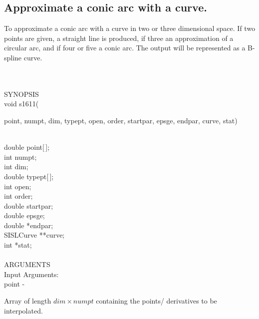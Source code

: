 \subsection{Approximate a conic arc with a curve.}
\begin{minipg1}
  To approximate a conic arc with a curve in two or three
  dimensional space. If two points are given, a straight line is
  produced, if three an approximation of a circular arc, and if four or
  five a conic arc.
  The output will be represented as a B-spline curve.
\end{minipg1} \\ \\
SYNOPSIS\\
        \>void s1611(\begin{minipg3}
                {\fov point}, {\fov numpt}, {\fov dim}, {\fov typept}, {\fov open}, {\fov order},
                {\fov startpar}, {\fov epsge}, {\fov endpar}, {\fov curve}, {\fov stat})
                \end{minipg3}\\[0.3ex]
                \>\>    double  \>      {\fov point}[\,];\\
                \>\>    int     \>      {\fov numpt};\\
                \>\>    int     \>      {\fov dim};\\
                \>\>    double  \>      {\fov typept}[\,];\\
                \>\>    int     \>      {\fov open};\\
                \>\>    int     \>      {\fov order};\\
                \>\>    double  \>      {\fov startpar};\\
                \>\>    double  \>      {\fov epsge};\\
                \>\>    double  \>      *{\fov endpar};\\
                \>\>    SISLCurve       \>      **{\fov curve};\\
                \>\>    int     \>      *{\fov stat};\\
\\
ARGUMENTS\\
        \>Input Arguments:\\
        \>\>    {\fov point}    \> - \>
                \begin{minipg2}
                  Array of length $dim\times numpt$ containing the
                  points/ derivatives to be interpolated.
                \end{minipg2}\\[0.3ex]
